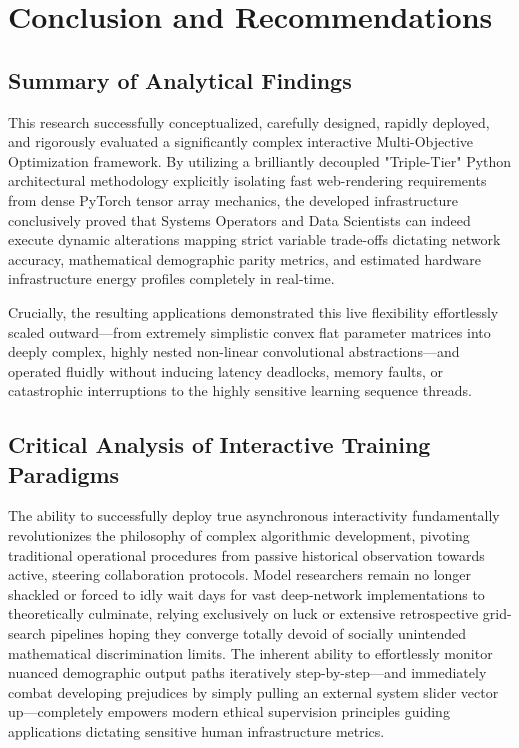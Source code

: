 \documentclass[12pt,a4paper]{article}
\begin{document}
\section{Conclusion and Recommendations}

\subsection{Summary of Analytical Findings}
This research successfully conceptualized, carefully designed, rapidly deployed, and rigorously evaluated a significantly complex interactive Multi-Objective Optimization framework. By utilizing a brilliantly decoupled "Triple-Tier" Python architectural methodology explicitly isolating fast web-rendering requirements from dense PyTorch tensor array mechanics, the developed infrastructure conclusively proved that Systems Operators and Data Scientists can indeed execute dynamic alterations mapping strict variable trade-offs dictating network accuracy, mathematical demographic parity metrics, and estimated hardware infrastructure energy profiles completely in real-time. 

Crucially, the resulting applications demonstrated this live flexibility effortlessly scaled outward—from extremely simplistic convex flat parameter matrices into deeply complex, highly nested non-linear convolutional abstractions—and operated fluidly without inducing latency deadlocks, memory faults, or catastrophic interruptions to the highly sensitive learning sequence threads.

\subsection{Critical Analysis of Interactive Training Paradigms}
The ability to successfully deploy true asynchronous interactivity fundamentally revolutionizes the philosophy of complex algorithmic development, pivoting traditional operational procedures from passive historical observation towards active, steering collaboration protocols. Model researchers remain no longer shackled or forced to idly wait days for vast deep-network implementations to theoretically culminate, relying exclusively on luck or extensive retrospective grid-search pipelines hoping they converge totally devoid of socially unintended mathematical discrimination limits. The inherent ability to effortlessly monitor nuanced demographic output paths iteratively step-by-step—and immediately combat developing prejudices by simply pulling an external system slider vector up—completely empowers modern ethical supervision principles guiding applications dictating sensitive human infrastructure metrics.
\end{document}
